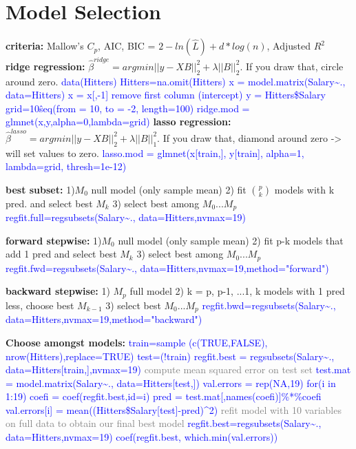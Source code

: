 \section{Model Selection}
\textbf{criteria: } Mallow's $C_p$, AIC, BIC = $2-ln(\hat L) + d*log(n)$, Adjusted $R^2$
\textbf{ridge regression: } $\hat\beta^{ridge} = argmin ||y-XB||_2^2+ \lambda||B||_2^2$. If you draw that, circle around zero. 
\textcolor{blue}{data(Hitters)
Hitters=na.omit(Hitters)
x = model.matrix(Salary\textasciitilde.,  data=Hitters)
x = x[,-1] remove first column (intercept)
y = Hitters\$Salary
grid=10\^seq(from = 10, to = -2, length=100)
ridge.mod = glmnet(x,y,alpha=0,lambda=grid)  }
\textbf{lasso regression: }
$\hat\beta^{lasso} = argmin ||y-XB||_2^2+ \lambda||B||_1^2$. If you draw that, diamond around zero -> will set values to zero. 
\textcolor{blue}{lasso.mod = glmnet(x[train,], y[train], alpha=1, 
                   lambda=grid, thresh=1e-12)}

\textbf{best subset: }
1)$M_0$ null model (only sample mean)
2) fit $p \choose k$ models with k pred. and select best $M_k$
3) select best among $M_0 ... M_p$
\textcolor{blue}{regfit.full=regsubsets(Salary\textasciitilde., data=Hitters,nvmax=19)}

\textbf{forward stepwise: }
1)$M_0$ null model (only sample mean)
2) fit p-k models that add 1 pred and select best $M_k$
3) select best among $M_0 ... M_p$
\textcolor{blue}{regfit.fwd=regsubsets(Salary\textasciitilde., data=Hitters,nvmax=19,method="forward")}

\textbf{backward stepwise: }
1) $M_p$ full model
2) k = p, p-1, ...1,
k models with 1 pred less, choose best $M_{k-1}$
3) select best $M_0 ... M_p$
\textcolor{blue}{regfit.bwd=regsubsets(Salary\textasciitilde., data=Hitters,nvmax=19,method="backward")}

\textbf{Choose amongst models: } \textcolor{blue}{train=sample (c(TRUE,FALSE), nrow(Hitters),replace=TRUE) test=(!train)
regfit.best = regsubsets(Salary\textasciitilde., data=Hitters[train,],nvmax=19)
 \textcolor{gray}{compute mean squared error on test set}
test.mat = model.matrix(Salary\textasciitilde., data=Hitters[test,])
val.errors = rep(NA,19)
for(i in 1:19){
  coefi = coef(regfit.best,id=i)
  pred = test.mat[,names(coefi)]\%*\%coefi
  val.errors[i] = mean((Hitters\$Salary[test]-pred)\^{}2)
}
 \textcolor{gray}{refit model with 10 variables on full data to obtain our final best model}
regfit.best=regsubsets(Salary\textasciitilde., data=Hitters,nvmax=19)
coef(regfit.best, which.min(val.errors))
}
